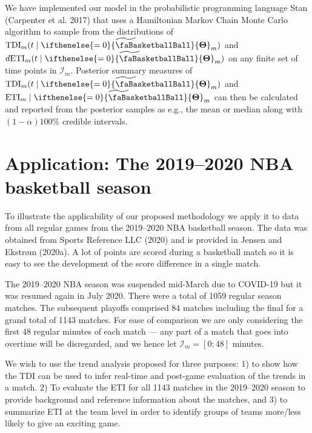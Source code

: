 \documentclass[
  11pt,
]{svjour3}
\theoremstyle{nonumberplain}
\begin{document}
We have implemented our model in the probabilistic programming language
Stan (Carpenter et al. 2017) that uses a Hamiltonian Markov Chain Monte
Carlo algorithm to sample from the distributions of
\(\textrm{TDI}_m(t \mid \widetilde{\ifthenelse{\value{bbsym4theta}=0}{\text{\faBasketballBall}}{\mathbf{\Theta}}}_m)\)
and
\(d\mathrm{ETI}_m(t \mid \widetilde{\ifthenelse{\value{bbsym4theta}=0}{\text{\faBasketballBall}}{\mathbf{\Theta}}}_m)\)
on any finite set of time points in \(\mathcal{I}_m\). Posterior summary
measures of
\(\textrm{TDI}_m(t \mid \widetilde{\ifthenelse{\value{bbsym4theta}=0}{\text{\faBasketballBall}}{\mathbf{\Theta}}}_m)\)
and
\(\mathrm{ETI}_m \mid \widetilde{\ifthenelse{\value{bbsym4theta}=0}{\text{\faBasketballBall}}{\mathbf{\Theta}}}_m\)
can then be calculated and reported from the posterior samples as e.g.,
the mean or median along with \((1-\alpha)100\%\) credible intervals.

\hypertarget{sec:application}{%
\section{Application: The 2019--2020 NBA basketball
season}\label{sec:application}}

To illustrate the applicability of our proposed methodology we apply it
to data from all regular games from the 2019--2020 NBA basketball
season. The data was obtained from Sports Reference LLC (2020) and is
provided in Jensen and Ekstrøm (2020a). A lot of points are scored
during a basketball match so it is easy to see the development of the
score difference in a single match.

The 2019--2020 NBA season was suspended mid-March due to COVID-19 but it
was resumed again in July 2020. There were a total of 1059 regular
season matches. The subsequent playoffs comprised 84 matches including
the final for a grand total of 1143 matches. For ease of comparison we
are only considering the first 48 regular minutes of each match --- any
part of a match that goes into overtime will be disregarded, and we
hence let \(\mathcal{I}_m = [0; 48]\) minutes.

We wish to use the trend analysis proposed for three purposes: 1) to
show how the TDI can be used to infer real-time and post-game evaluation
of the trends in a match. 2) To evaluate the ETI for all 1143 matches in
the 2019--2020 season to provide background and reference information
about the matches, and 3) to summarize ETI at the team level in order to
identify groups of teams more/less likely to give an exciting game.
\end{document}
